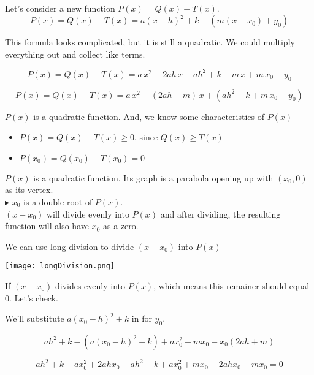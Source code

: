 \documentclass{ximera}
\begin{document}
Let's consider a new function $P(x) = Q(x) - T(x)$. \\


\[
P(x) = Q(x) - T(x) = a (x - h)^2 + k - (m(x - x_0) + y_0)
\]

This formula looks complicated, but it is still a quadratic.  We could multiply everything out and collect like terms.




\[
P(x) = Q(x) - T(x) = a\, x^2 - 2ah \, x + ah^2 + k - m \, x + m \, x_0 - y_0
\]


\[
P(x) = Q(x) - T(x) = a\, x^2 - (2ah - m) \, x + (ah^2 + k  + m \, x_0 - y_0)
\]



$P(x)$ is a quadratic function.  And, we know some characteristics of $P(x)$



\begin{itemize}
\item $P(x) = Q(x) - T(x) \geq 0$, since $Q(x) \geq T(x)$
\item $P(x_0) = Q(x_0) - T(x_0) = 0$
\end{itemize}




$P(x)$ is a quadratic function.  Its graph is a parabola opening up with $(x_0, 0)$ as its vertex. \\


$\blacktriangleright$   $x_0$ is a double root of $P(x)$. \\


$(x - x_0)$ will divide evenly into $P(x)$ and after dividing, the resulting function will also have $x_0$ as a zero.



We can use long division to divide $(x - x_0)$ into $P(x)$



\begin{image}
\texttt{[image: longDivision.png]}
\end{image}


If $(x - x_0)$ divides evenly into $P(x)$, which means this remainer should equal $0$.  Let's check.



We'll substitute $a (x_0 - h)^2 + k$ in for $y_0$.

\[
a h^2 + k - (a (x_0 - h)^2 + k) + a x_0^2 + m x_0 - x_0 (2 a h + m)
\]


\[
a h^2 + k - a x_0^2 + 2 a h x_0 - a h^2 - k + a x_0^2 + m x_0 - 2 a h x_0 - m x_0 = 0
\]
\end{document}
